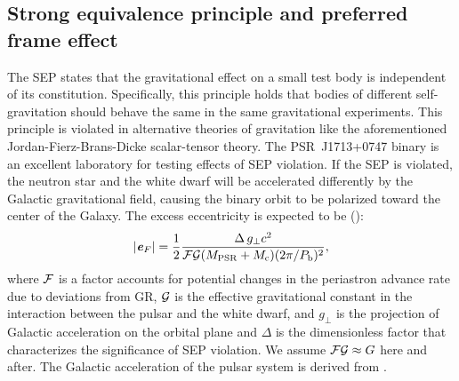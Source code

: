 \subsection{Strong equivalence principle and preferred frame effect}
\label{sec:sep}
The SEP states that the gravitational
effect on a small test body is independent of its constitution. Specifically,
this principle holds that bodies of different self-gravitation should behave the same in
the same gravitational experiments. This principle is violated in alternative
theories of gravitation like the aforementioned Jordan-Fierz-Brans-Dicke
scalar-tensor theory. The PSR~J1713+0747 binary is an excellent laboratory for testing 
effects of SEP violation. If the SEP is violated, the neutron star and the white
dwarf will be accelerated differently by the Galactic gravitational field, causing
the binary orbit to be polarized toward the center of the Galaxy. The excess 
eccentricity is expected to be (\citealt{ds91}):
\begin{equation}
|\textbf{\textit{e}}_F| = \frac{1}{2}\frac{\Delta\, g_{\bot}
  c^2}{\msF\msG(M_{\rm PSR}+M_{\rm
c})(2\pi/P_{\rm b})^2},
\end{equation}
where $\mathcal{F}$ is a factor accounts for potential changes in the periastron advance rate
due to deviations from GR, $\mathcal{G}$ is the effective gravitational constant in the interaction
between the pulsar and the white dwarf, and $g_{\bot}$ is the projection of Galactic acceleration on the orbital plane 
and $\Delta$ is the dimensionless factor that characterizes the significance 
of SEP violation. We assume $\mathcal{F}\mathcal{G}\approx G$ here and after.
The Galactic acceleration of the pulsar system is derived from \citet{hf04a, rmb+14}.

